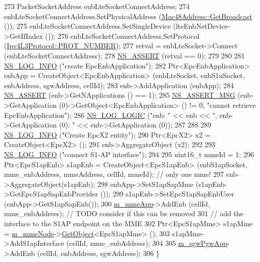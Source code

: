 \begin{DoxyCode}
273   PacketSocketAddress enbLteSocketConnectAddress;
274   enbLteSocketConnectAddress.SetPhysicalAddress (\hyperlink{classns3_1_1Mac48Address_a55156e302c6bf950c0b558365adbde84}{Mac48Address::GetBroadcast} ());
275   enbLteSocketConnectAddress.SetSingleDevice (lteEnbNetDevice->GetIfIndex ());
276   enbLteSocketConnectAddress.SetProtocol (\hyperlink{classns3_1_1Ipv4L3Protocol_a0146bc84815b7b73adb9c62cdafc9442}{Ipv4L3Protocol::PROT\_NUMBER});
277   retval = enbLteSocket->Connect (enbLteSocketConnectAddress);
278   \hyperlink{assert_8h_a6dccdb0de9b252f60088ce281c49d052}{NS\_ASSERT} (retval == 0);  
279   
280 
281   \hyperlink{group__logging_gafbd73ee2cf9f26b319f49086d8e860fb}{NS\_LOG\_INFO} (\textcolor{stringliteral}{"create EpcEnbApplication"});
282   Ptr<EpcEnbApplication> enbApp = CreateObject<EpcEnbApplication> (enbLteSocket, enbS1uSocket, enbAddress, 
      sgwAddress, cellId);
283   enb->AddApplication (enbApp);
284   \hyperlink{assert_8h_a6dccdb0de9b252f60088ce281c49d052}{NS\_ASSERT} (enb->GetNApplications () == 1);
285   \hyperlink{assert_8h_aff5ece9066c74e681e74999856f08539}{NS\_ASSERT\_MSG} (enb->GetApplication (0)->GetObject<EpcEnbApplication> () != 0, \textcolor{stringliteral}{"cannot
       retrieve EpcEnbApplication"});
286   \hyperlink{group__logging_ga88acd260151caf2db9c0fc84997f45ce}{NS\_LOG\_LOGIC} (\textcolor{stringliteral}{"enb: "} << enb << \textcolor{stringliteral}{", enb->GetApplication (0): "} << enb->GetApplication (0));
287 
288   
289   \hyperlink{group__logging_gafbd73ee2cf9f26b319f49086d8e860fb}{NS\_LOG\_INFO} (\textcolor{stringliteral}{"Create EpcX2 entity"});
290   Ptr<EpcX2> x2 = CreateObject<EpcX2> ();
291   enb->AggregateObject (x2);
292 
293   \hyperlink{group__logging_gafbd73ee2cf9f26b319f49086d8e860fb}{NS\_LOG\_INFO} (\textcolor{stringliteral}{"connect S1-AP interface"});
294 
295   uint16\_t mmeId = 1;
296   Ptr<EpcS1apEnb> s1apEnb = CreateObject<EpcS1apEnb> (enbS1apSocket, mme\_enbAddress, mmeAddress, cellId, 
      mmeId); \textcolor{comment}{// only one mme!}
297   enb->AggregateObject(s1apEnb);
298   enbApp->SetS1apSapMme (s1apEnb->GetEpcS1apSapEnbProvider ());
299   s1apEnb->SetEpcS1apSapEnbUser (enbApp->GetS1apSapEnb());
300   \hyperlink{classns3_1_1PointToPointEpcHelper_a283ac6856b092d9cfa751c04029cbdc3}{m\_mmeApp}->AddEnb (cellId, mme\_enbAddress); \textcolor{comment}{// TODO consider if this can be removed}
301   \textcolor{comment}{// add the interface to the S1AP endpoint on the MME}
302   Ptr<EpcS1apMme> s1apMme = \hyperlink{classns3_1_1PointToPointEpcHelper_a426c5c35e890ce608c925348e4023b0f}{m\_mmeNode}->\hyperlink{classns3_1_1Object_a13e18c00017096c8381eb651d5bd0783}{GetObject}<EpcS1apMme> ();
303   s1apMme->AddS1apInterface (cellId, mme\_enbAddress);
304   
305   \hyperlink{classns3_1_1PointToPointEpcHelper_ae802bf7daf9022ab6d78333de1ac5a31}{m\_sgwPgwApp}->AddEnb (cellId, enbAddress, sgwAddress);
306 \}
\end{DoxyCode}


